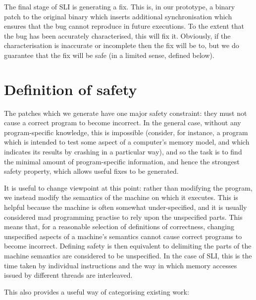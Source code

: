 \documentclass[10pt,a4paper,twocolumn]{article}
\begin{document}
The final stage of SLI is generating a fix.  This is, in our
prototype, a binary patch to the original binary which inserts
additional synchronisation which ensures that the bug cannot reproduce
in future executions.  To the extent that the bug has been accurately
characterised, this will fix it.  Obviously, if the characterisation
is inaccurate or incomplete then the fix will be to, but we do
guarantee that the fix will be safe (in a limited sense, defined
below).

\section{Definition of safety}

The patches which we generate have one major safety constraint: they
must not cause a correct program to become incorrect.  In the general
case, without any program-specific knowledge, this is impossible
(consider, for instance, a program which is intended to test some
aspect of a computer's memory model, and which indicates its results
by crashing in a particular way), and so the task is to find the
minimal amount of program-specific information, and hence the
strongest safety property, which allows useful fixes to be generated.

It is useful to change viewpoint at this point: rather than modifying
the program, we instead modify the semantics of the machine on which
it executes.  This is helpful because the machine is often somewhat
under-specified, and it is usually considered mad programming practise
to rely upon the unspecified parts.  This means that, for a reasonable
selection of definitions of correctness, changing unspecified aspects
of a machine's semantics cannot cause correct programs to become
incorrect.  Defining safety is then equivalent to delimiting the parts
of the machine semantics are considered to be unspecified.  In the
case of SLI, this is the time taken by individual instructions and the
way in which memory accesses issued by different threads are
interleaved.

This also provides a useful way of categorising existing
work:
\end{document}
